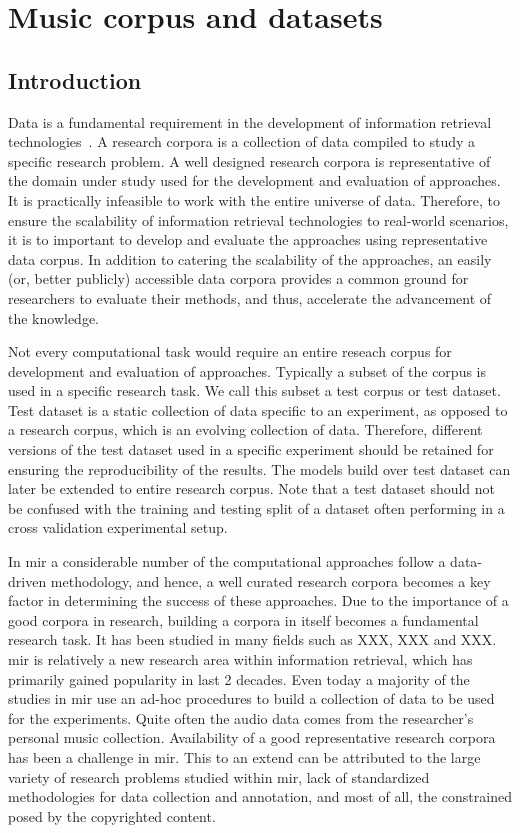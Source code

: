 
\chapter{Music corpus and datasets}\label{chap:datasets}

\section{Introduction}
\label{sec:corpus_intro}

Data is a fundamental requirement in the development of information retrieval technologies~\citep{manning2008introduction}. A research corpora is a collection of data compiled to study a specific research problem. A well designed research corpora is representative of the domain under study used for the development and evaluation of approaches. It is practically infeasible to work with the entire universe of data. Therefore, to ensure the scalability of information retrieval technologies to real-world scenarios, it is to important to develop and evaluate the approaches using representative data corpus. In addition to catering the scalability of the approaches, an easily (or, better publicly) accessible data corpora provides a common ground for researchers to evaluate their methods, and thus, accelerate the advancement of the knowledge. 

Not every computational task would require an entire reseach corpus for development and evaluation of approaches. Typically a subset of the corpus is used in a specific research task. We call this subset a test corpus or test dataset. Test dataset is a static collection of data specific to an experiment, as opposed to a research corpus, which is an evolving collection of data. Therefore, different versions of the test dataset used in a specific experiment should be retained for ensuring the reproducibility of the results. The models build over test dataset can later be extended to entire research corpus. Note that a test dataset should not be confused with the training and testing split of a dataset often performing in a cross validation experimental setup.

In \gls{mir} a considerable number of the computational approaches follow a data-driven methodology, and hence, a well curated research corpora becomes a key factor in determining the success of these approaches. Due to the importance of a good corpora in research, building a corpora in itself becomes a fundamental research task. It has been studied in many fields such as XXX, XXX and XXX. \Gls{mir} is relatively a new research area within information retrieval, which has primarily gained popularity in last 2 decades. Even today a majority of the studies in \gls{mir} use an ad-hoc procedures to build a collection of data to be used for the experiments. Quite often the audio data comes from the researcher's personal music collection. Availability of a good representative research corpora has been a challenge in \gls{mir}. This to an extend can be attributed to the large variety of research problems studied within \gls{mir}, lack of standardized methodologies for data collection and annotation, and most of all, the constrained posed by the copyrighted content.

